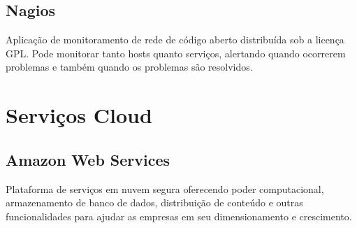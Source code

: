 	\subsection{Nagios} Aplicação de monitoramento de rede de código 
	aberto distribuída sob a licença GPL. Pode monitorar tanto hosts 
	quanto serviços, alertando quando ocorrerem problemas e também 
	quando os problemas são resolvidos.

    \section{Serviços Cloud}

	\subsection{Amazon Web Services} Plataforma de serviços em nuvem 
	segura oferecendo poder computacional, armazenamento de banco de 
	dados, distribuição de conteúdo e outras funcionalidades para 
	ajudar as empresas em seu dimensionamento e crescimento.

